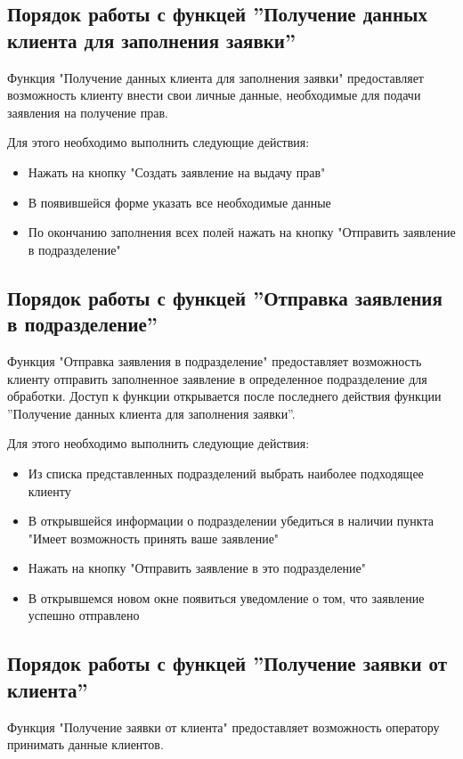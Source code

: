 \documentclass[russian, utf8, 12pt,pointsubsection,floatsubsection]{eskdtext}
\begin{document}
\subsection{Порядок работы с функцей ''Получение данных клиента для заполнения заявки''}
Функция "Получение данных клиента для заполнения заявки" предоставляет возможность клиенту внести свои личные данные, необходимые для подачи заявления на получение прав.

Для этого необходимо выполнить следующие действия:
\begin{itemize}
    \item Нажать на кнопку "Создать заявление на выдачу прав"
    \item В появившейся форме указать все необходимые данные
    \item По окончанию заполнения всех полей нажать на кнопку "Отправить заявление в подразделение"
\end{itemize}

\subsection{Порядок работы с функцей ''Отправка заявления в подразделение''}
Функция "Отправка заявления в подразделение" предоставляет возможность клиенту отправить заполненное заявление в определенное подразделение для обработки. Доступ к функции открывается после последнего действия функции ''Получение данных клиента для заполнения заявки''.

Для этого необходимо выполнить следующие действия:
\begin{itemize}
    \item Из списка представленных подразделений выбрать наиболее подходящее клиенту
    \item В открывшейся информации о подразделении убедиться в наличии пункта "Имеет возможность принять ваше заявление"
    \item Нажать на кнопку "Отправить заявление в это подразделение"
    \item В открывшемся новом окне появиться уведомление о том, что заявление успешно отправлено
\end{itemize}

\subsection{Порядок работы с функцей ''Получение заявки от клиента''}
Функция "Получение заявки от клиента" предоставляет возможность оператору принимать данные клиентов.
\end{document}
